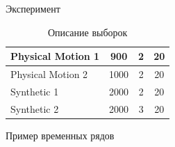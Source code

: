 \documentclass{beamer}
\begin{document}
\begin{frame}{Эксперимент}
\begin{table}[h]
	\begin{center}
	\caption{Описание выборок}
		\begin{tabular}{|c|c|c|c|}
		\hline
			\multicolumn{1}{|l|}{Physical Motion 1}
			& 900& 2& 20\\
			\hline
			\multicolumn{1}{|l|}{Physical Motion 2}
			& 1000& 2& 20\\
			\hline
			\multicolumn{1}{|l|}{Synthetic 1}
			& 2000& 2& 20\\
			\hline
			\multicolumn{1}{|l|}{Synthetic 2}
			& 2000& 3& 20\\
		\hline
		\end{tabular}
	\end{center}
\end{table}
\end{frame}
\begin{frame}{Пример временных рядов}
	\begin{figure}[h!t]\center
		\\
		\\
	\end{figure}
\end{frame}
\end{document}

